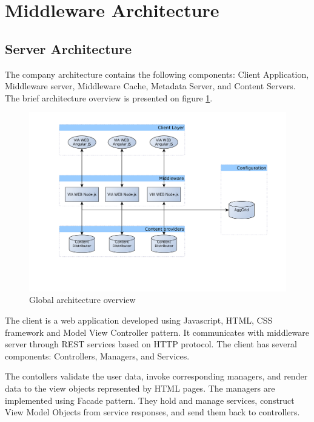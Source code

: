 \section{Middleware Architecture}

\subsection{Server Architecture}

The company architecture contains the following components: Client Application, Middleware server, Middleware Cache, Metadata Server, and Content Servers. The brief architecture overview is presented on figure \ref{fig:arch_overview}. 


\begin{figure}[h]
    \centering
	\includegraphics[width=\textwidth]{images/thesis_global_architecture_existing.png}
    \caption{Global architecture overview}
    \label{fig:arch_overview}
\end{figure}


The client is a web application developed using Javascript, HTML, CSS framework and Model View Controller pattern. It communicates with middleware server through REST services based on HTTP protocol. The client has several components: Controllers, Managers, and Services. 

The contollers validate the user data, invoke corresponding managers, and render data to the view objects represented by HTML pages. The managers are implemented using Facade pattern\cite{DesignPatterns}. They hold and manage services, construct View Model Objects from service responses, and send them back to controllers. 

